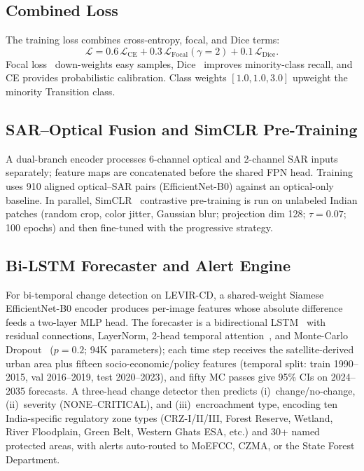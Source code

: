 \documentclass[conference]{IEEEtran}
\begin{document}
\subsection{Combined Loss}

The training loss combines cross-entropy, focal, and Dice terms:
\begin{equation}
\mathcal{L} = 0.6\,\mathcal{L}_{\text{CE}} + 0.3\,\mathcal{L}_{\text{Focal}}(\gamma{=}2) + 0.1\,\mathcal{L}_{\text{Dice}}.
\label{eq:loss}
\end{equation}
Focal loss~\cite{lin2017focal} down-weights easy samples, Dice~\cite{milletari2016vnet} improves minority-class recall, and CE provides probabilistic calibration. Class weights $[1.0, 1.0, 3.0]$ upweight the minority Transition class.

\subsection{SAR--Optical Fusion and SimCLR Pre-Training}

A dual-branch encoder processes 6-channel optical and 2-channel SAR inputs separately; feature maps are concatenated before the shared FPN head. Training uses 910 aligned optical--SAR pairs (EfficientNet-B0) against an optical-only baseline. In parallel, SimCLR~\cite{chen2020simclr} contrastive pre-training is run on unlabeled Indian patches (random crop, color jitter, Gaussian blur; projection dim 128; $\tau = 0.07$; 100 epochs) and then fine-tuned with the progressive strategy.

\subsection{Bi-LSTM Forecaster and Alert Engine}

For bi-temporal change detection on LEVIR-CD, a shared-weight Siamese EfficientNet-B0 encoder produces per-image features whose absolute difference feeds a two-layer MLP head. The forecaster is a bidirectional LSTM~\cite{hochreiter1997,schuster1997bidir} with residual connections, LayerNorm, 2-head temporal attention~\cite{vaswani2017attention}, and Monte-Carlo Dropout~\cite{gal2016mcdropout} ($p=0.2$; 94K parameters); each time step receives the satellite-derived urban area plus fifteen socio-economic/policy features (temporal split: train 1990--2015, val 2016--2019, test 2020--2023), and fifty MC passes give 95\% CIs on 2024--2035 forecasts. A three-head change detector then predicts (i)~change/no-change, (ii)~severity (NONE--CRITICAL), and (iii)~encroachment type, encoding ten India-specific regulatory zone types (CRZ-I/II/III, Forest Reserve, Wetland, River Floodplain, Green Belt, Western Ghats ESA, etc.) and 30+ named protected areas, with alerts auto-routed to MoEFCC, CZMA, or the State Forest Department.
\end{document}
